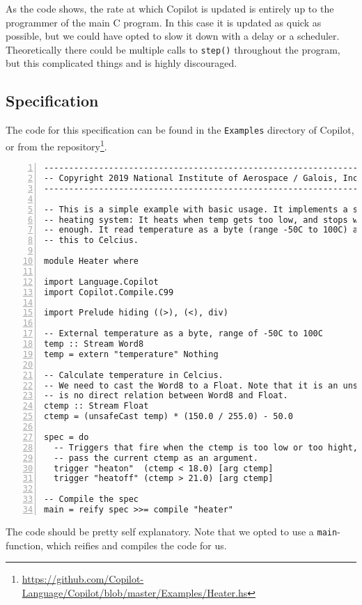 As the code shows, the rate at which Copilot is updated is entirely up to the
programmer of the main C program. In this case it is updated as quick as
possible, but we could have opted to slow it down with a delay or a scheduler.
Theoretically there could be multiple calls to \texttt{step()} throughout the
program, but this complicated things and is highly discouraged.


\subsection{Specification}
The code for this specification can be found in the \texttt{Examples} directory
of Copilot, or from the
repository\footnote{\url{https://github.com/Copilot-Language/Copilot/blob/master/Examples/Heater.hs}}.

\begin{lstlisting}[language = Copilot, frame = single, numbers = left]
--------------------------------------------------------------------------------
-- Copyright 2019 National Institute of Aerospace / Galois, Inc.
--------------------------------------------------------------------------------

-- This is a simple example with basic usage. It implements a simple home
-- heating system: It heats when temp gets too low, and stops when it is high
-- enough. It read temperature as a byte (range -50C to 100C) and translates
-- this to Celcius.

module Heater where

import Language.Copilot
import Copilot.Compile.C99

import Prelude hiding ((>), (<), div)

-- External temperature as a byte, range of -50C to 100C
temp :: Stream Word8
temp = extern "temperature" Nothing

-- Calculate temperature in Celcius.
-- We need to cast the Word8 to a Float. Note that it is an unsafeCast, as there
-- is no direct relation between Word8 and Float.
ctemp :: Stream Float
ctemp = (unsafeCast temp) * (150.0 / 255.0) - 50.0

spec = do
  -- Triggers that fire when the ctemp is too low or too hight,
  -- pass the current ctemp as an argument.
  trigger "heaton"  (ctemp < 18.0) [arg ctemp]
  trigger "heatoff" (ctemp > 21.0) [arg ctemp]

-- Compile the spec
main = reify spec >>= compile "heater"
\end{lstlisting}
The code should be pretty self explanatory. Note that we opted to use a
\texttt{main}-function, which reifies and compiles the code for us.

